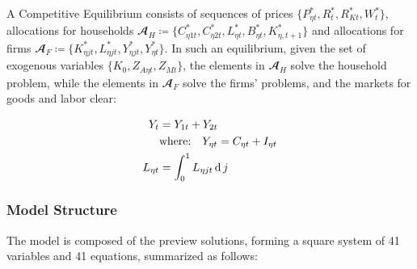\documentclass[../thesis.tex]{subfiles}
\begin{document}
A Competitive Equilibrium consists of sequences of prices $\{P_{\eta t}^{\ast}, R_t^{\ast}, R_{Kt}^{\ast}, W_t^{\ast}\}$, allocations for households $\mathbfscr{A}_H \coloneq \{C_{\eta 1 t}^{\ast}, C_{\eta 2 t}^{\ast}, L_{\eta t}^{\ast}, B_{\eta t}^{\ast}, K_{\eta, t+1}^{\ast}\}$ and allocations  for firms $\mathbfscr{A}_F \coloneq \{K_{\eta jt}^{\ast}, L_{\eta jt}^{\ast}, Y_{\eta jt}^{\ast}, Y_{\eta t}^{\ast}\}$. In such an equilibrium, given the set of exogenous variables $\{K_0, Z_{A\eta t}, Z_{Mt}\}$, the elements in $\mathbfscr{A}_H$ solve the household problem, while the elements in $\mathbfscr{A}_F$ solve the firms' problems, and the markets for goods and labor clear:
\begin{tcolorbox}[colback=red!5!white,colframe=red!75!black]
	
	\begin{align}
		Y_{t} &= Y_{1 t} + Y_{2 t} \label{eq_v2:reg-market-clearing-condition-Yt} \\
		& \text{where:} \quad Y_{\eta t} = C_{\eta t} + I_{\eta t} \label{eq_v2:reg-regional-demand} \\
		L_{\eta t} &= \int_{0}^{1} L_{\eta jt} \operatorname{d} j \label{eq_v2:reg-market-clearing-condition-Lt}
	\end{align}
	
\end{tcolorbox}

\begin{comment}

\begin{align}
	Y_{t} &= Y_{1 t} + Y_{2 t} \label{eq_v2:reg-market-clearing-condition-Yt} \\
	& \text{where:} \quad Y_{\eta t} = C_{\eta 1 t} + C_{\eta 2 t} + I_{\eta t} \label{eq_v2:reg-regional-demand} \\
	L_{\eta t} &= \int_{0}^{1} L_{\eta jt} \dif j \label{eq_v2:reg-market-clearing-condition-Lt}
\end{align}

\end{comment}



\subsubsection{Model Structure}

The model is composed of the preview solutions, forming a square system of 41 variables and 41 equations, summarized as follows:
\end{document}

